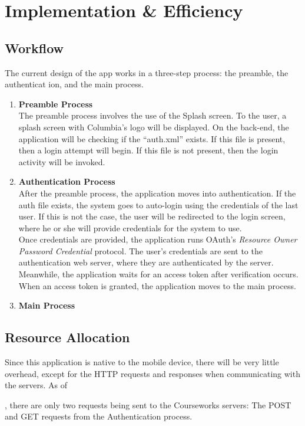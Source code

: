 \documentclass{article}
\begin{document}
\section{Implementation \& Efficiency}

\subsection{Workflow}
The current design of the app works in a three-step process: the preamble, the authenticat
ion, and the main process.
\begin{enumerate}
    \item \textbf{Preamble Process} \\ 
        The preamble process involves the use of the Splash screen. To the user, a splash 
        screen with Columbia's logo will be displayed. On the back-end, the application 
        will be checking if the ``auth.xml'' exists. If this file is present, then a login
        attempt will begin. If this file is not present, then the login activity will be 
        invoked.
    \item \textbf{Authentication Process} \\ 
        After the preamble process, the application moves into authentication. If the auth
        file exists, the system goes to auto-login using the credentials of the last user.
        If this is not the case, the user will be redirected to the login screen, where he
        or she will provide credentials for the system to use. \\ Once credentials are 
        provided, the application runs OAuth's \emph{Resource Owner Password Credential} 
        protocol. The user's credentials are sent to the authentication web server, where 
        they are authenticated by the server. Meanwhile, the application
        waits for an access token after verification occurs. When an access token is 
        granted, the application moves to the main process.
    \item \textbf{Main Process} 
\end{enumerate}

\subsection{Resource Allocation}
Since this application is native to the mobile device, there will be very little 
overhead, except for the HTTP requests and responses when communicating with the 
servers. As of \date{\today}, there are only two requests being sent to the Courseworks 
servers: The POST and GET requests from the Authentication process.
\end{document}
